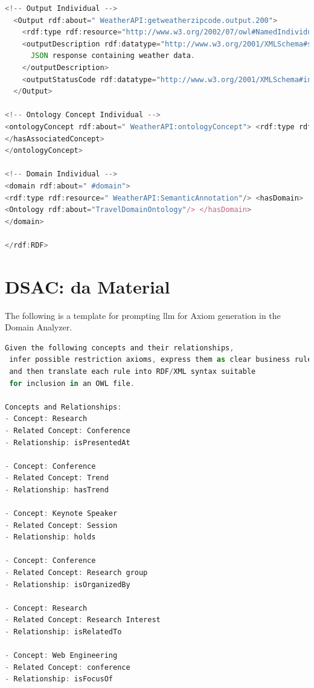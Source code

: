 \begin{appendix}
\begin{lstlisting}[language=JavaScript, captionpos=t, caption=Component Ontology individuals]
  <!-- Output Individual -->
  <Output rdf:about=" WeatherAPI:getweatherzipcode.output.200">
    <rdf:type rdf:resource="http://www.w3.org/2002/07/owl#NamedIndividual"/>
    <outputDescription rdf:datatype="http://www.w3.org/2001/XMLSchema#string">
      JSON response containing weather data.
    </outputDescription>
    <outputStatusCode rdf:datatype="http://www.w3.org/2001/XMLSchema#integer">200</outputStatusCode>
  </Output>

<!-- Ontology Concept Individual --> 
<ontologyConcept rdf:about=" WeatherAPI:ontologyConcept"> <rdf:type rdf:resource="#SemanticAnnotation"/> <hasAssociatedConcept>Travel:Climate
</hasAssociatedConcept> 
</ontologyConcept>

<!-- Domain Individual --> 
<domain rdf:about=" #domain"> 
<rdf:type rdf:resource=" WeatherAPI:SemanticAnnotation"/> <hasDomain> 
<Ontology rdf:about="TravelDomainOntology"/> </hasDomain> 
</domain>

</rdf:RDF>


\end{lstlisting}

\chapter{DSAC: \gls{da} Material}
The following is a template for prompting \gls{llm} for Axiom generation in the  Domain Analyzer.

\begin{lstlisting}[language=JavaScript, captionpos=t, caption=Prompt Template for Axioms Extraction]
Given the following concepts and their relationships,
 infer possible restriction axioms, express them as clear business rules, 
 and then translate each rule into RDF/XML syntax suitable 
 for inclusion in an OWL file.

Concepts and Relationships:
- Concept: Research
- Related Concept: Conference
- Relationship: isPresentedAt

- Concept: Conference
- Related Concept: Trend
- Relationship: hasTrend

- Concept: Keynote Speaker
- Related Concept: Session
- Relationship: holds

- Concept: Conference
- Related Concept: Research group
- Relationship: isOrganizedBy

- Concept: Research
- Related Concept: Research Interest
- Relationship: isRelatedTo

- Concept: Web Engineering
- Related Concept: conference
- Relationship: isFocusOf


\end{lstlisting}
\end{appendix}
